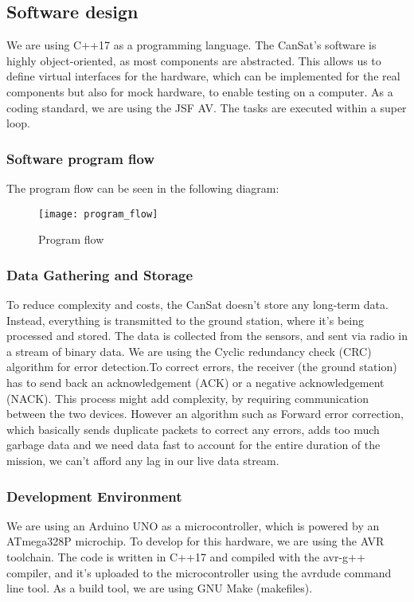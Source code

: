 \subsection{Software design}

We are using C++17 as a programming language. The CanSat's software is highly object-oriented, as most components are abstracted. This allows us to define virtual interfaces for the hardware, which can be implemented for the real components but also for mock hardware, to enable testing on a computer. As a coding standard, we are using the JSF AV. The tasks are executed within a super loop.

\subsubsection{Software program flow}

The program flow can be seen in the following diagram:

\begin{figure}[H]
\centering
\texttt{[image: program\_flow]}
\caption{Program flow}
\end{figure}

\subsubsection{Data Gathering and Storage}

To reduce complexity and costs, the CanSat doesn't store any long-term data. Instead, everything is transmitted to the ground station, where it's being processed and stored. The data is collected from the sensors, and sent via radio in a stream of binary data. We are using the Cyclic redundancy check (CRC) algorithm for error detection.To correct errors, the receiver (the ground station) has to send back an acknowledgement (ACK) or a negative acknowledgement (NACK). This process might add complexity, by requiring communication between the two devices. However an algorithm such as Forward error correction, which basically sends duplicate packets to correct any errors, adds too much garbage data and we need data fast to account for the entire duration of the mission, we can't afford any lag in our live data stream.

\subsubsection{Development Environment}

We are using an Arduino UNO as a microcontroller, which is powered by an ATmega328P microchip. To develop for this hardware, we are using the AVR toolchain. The code is written in C++17 and compiled with the avr-g++ compiler, and it's uploaded to the microcontroller using the avrdude command line tool. As a build tool, we are using GNU Make (makefiles).

